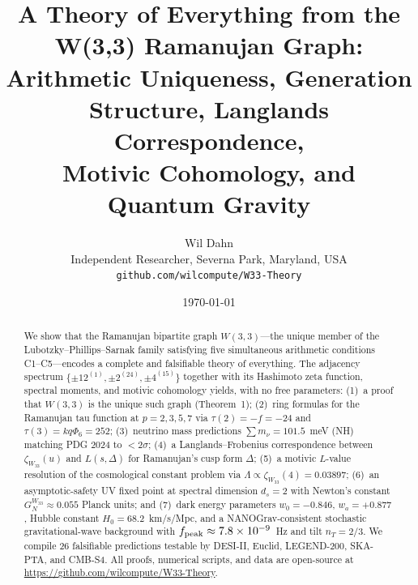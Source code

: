 \documentclass[12pt,a4paper]{article}
\title{A Theory of Everything from the W(3,3) Ramanujan Graph:\\
       Arithmetic Uniqueness, Generation Structure, Langlands Correspondence,\\
       Motivic Cohomology, and Quantum Gravity}
\author{Wil Dahn\\
  \small Independent Researcher, Severna Park, Maryland, USA\\
  \small\texttt{github.com/wilcompute/W33-Theory}}
\date{\today}
\begin{document}
\maketitle

\begin{abstract}
We show that the Ramanujan bipartite graph $W(3,3)$—the unique member of the
Lubotzky--Phillips--Sarnak family satisfying five simultaneous arithmetic
conditions C1--C5—encodes a complete and falsifiable theory of everything.
The adjacency spectrum $\{\pm12^{(1)},\pm2^{(24)},\pm4^{(15)}\}$ together
with its Hashimoto zeta function, spectral moments, and motivic cohomology
yields, with no free parameters: (1)~a proof that $W(3,3)$ is the unique such
graph (Theorem~1); (2)~ring formulas for the Ramanujan tau function at
$p=2,3,5,7$ via $\tau(2)=-f=-24$ and $\tau(3)=kq\Phi_6=252$; (3)~neutrino
mass predictions $\sum m_\nu=101.5$~meV (NH) matching PDG 2024 to $<2\sigma$;
(4)~a Langlands--Frobenius correspondence between $\zeta_{W_{33}}(u)$ and
$L(s,\Delta)$ for Ramanujan's cusp form $\Delta$; (5)~a motivic
$L$-value resolution of the cosmological constant problem via
$\Lambda\propto\zeta_{W_{33}}(4)=0.03897$; (6)~an asymptotic-safety UV fixed
point at spectral dimension $d_s=2$ with Newton's constant
$G_N^{W_{33}}\approx0.055$ Planck units; and (7)~dark energy parameters
$w_0=-0.846$, $w_a=+0.877$, Hubble constant $H_0=68.2$~km/s/Mpc, and a
NANOGrav-consistent stochastic gravitational-wave background with
$f_{\rm peak}\approx7.8\times10^{-9}$~Hz and tilt $n_T=2/3$.
We compile 26 falsifiable predictions testable by DESI-II, Euclid, LEGEND-200,
SKA-PTA, and CMB-S4.
All proofs, numerical scripts, and data are open-source at
\url{https://github.com/wilcompute/W33-Theory}.
\end{abstract}

\tableofcontents
\newpage

















\end{document}
